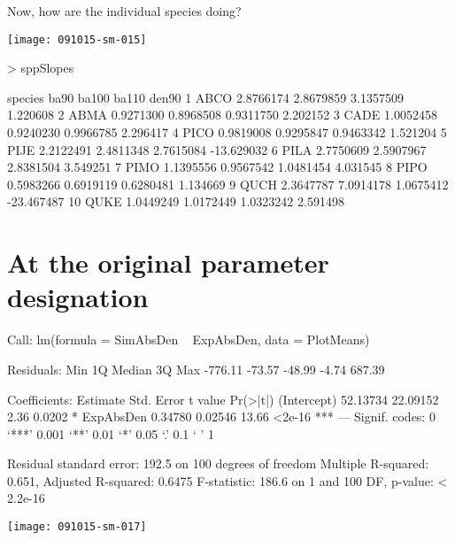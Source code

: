 \documentclass{article}
\begin{document}
Now, how are the individual species doing?

\texttt{[image: 091015-sm-015]}
\begin{Schunk}
\begin{Sinput}
>   sppSlopes
\end{Sinput}
\begin{Soutput}
   species      ba90     ba100     ba110      den90
1     ABCO 2.8766174 2.8679859 3.1357509   1.220608
2     ABMA 0.9271300 0.8968508 0.9311750   2.202152
3     CADE 1.0052458 0.9240230 0.9966785   2.296417
4     PICO 0.9819008 0.9295847 0.9463342   1.521204
5     PIJE 2.2122491 2.4811348 2.7615084 -13.629032
6     PILA 2.7750609 2.5907967 2.8381504   3.549251
7     PIMO 1.1395556 0.9567542 1.0481454   4.031545
8     PIPO 0.5983266 0.6919119 0.6280481   1.134669
9     QUCH 2.3647787 7.0914178 1.0675412 -23.467487
10    QUKE 1.0449249 1.0172449 1.0323242   2.591498
\end{Soutput}
\end{Schunk}


\newpage
\section{At the original parameter designation}
\begin{Schunk}
\begin{Soutput}
Call:
lm(formula = SimAbsDen ~ ExpAbsDen, data = PlotMeans)

Residuals:
    Min      1Q  Median      3Q     Max 
-776.11  -73.57  -48.99   -4.74  687.39 

Coefficients:
            Estimate Std. Error t value Pr(>|t|)    
(Intercept) 52.13734   22.09152    2.36   0.0202 *  
ExpAbsDen    0.34780    0.02546   13.66   <2e-16 ***
---
Signif. codes:  0 ‘***’ 0.001 ‘**’ 0.01 ‘*’ 0.05 ‘.’ 0.1 ‘ ’ 1

Residual standard error: 192.5 on 100 degrees of freedom
Multiple R-squared:  0.651,	Adjusted R-squared:  0.6475 
F-statistic: 186.6 on 1 and 100 DF,  p-value: < 2.2e-16
\end{Soutput}
\end{Schunk}
\texttt{[image: 091015-sm-017]}
\end{document}
